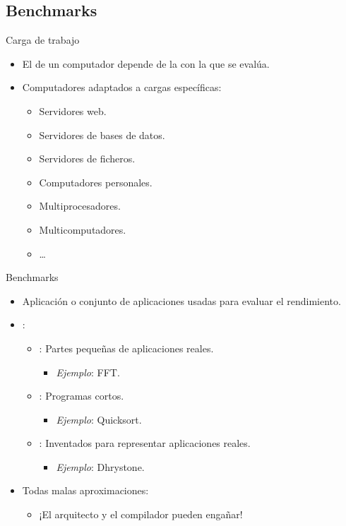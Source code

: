 \subsection{Benchmarks}

\begin{frame}[t]{Carga de trabajo}
\begin{itemize}
  \item El  de un computador depende de 
        la  con la que se evalúa.
  \item Computadores adaptados a cargas específicas:
    \begin{itemize}
      \item Servidores web.
      \item Servidores de bases de datos.
      \item Servidores de ficheros.
      \item Computadores personales.
      \item Multiprocesadores.
      \item Multicomputadores.
      \item \ldots
    \end{itemize}
\end{itemize}
\end{frame}

\begin{frame}[t]{Benchmarks}
\begin{itemize}
  \item Aplicación o conjunto de aplicaciones usadas para evaluar el rendimiento.
  \item {}:
    \begin{itemize}
      \item {}: Partes pequeñas de aplicaciones reales.
        \begin{itemize}
          \item \emph{Ejemplo}: FFT.
        \end{itemize}
      \item {}: Programas cortos.
        \begin{itemize}
          \item \emph{Ejemplo}: Quicksort.
        \end{itemize}
      \item {}: Inventados para representar aplicaciones reales.
        \begin{itemize}
          \item \emph{Ejemplo}: Dhrystone.
        \end{itemize}
    \end{itemize}
  \item Todas malas aproximaciones:
    \begin{itemize}
      \item \alert{¡El arquitecto y el compilador pueden engañar!}
    \end{itemize}
\end{itemize}
\end{frame}

